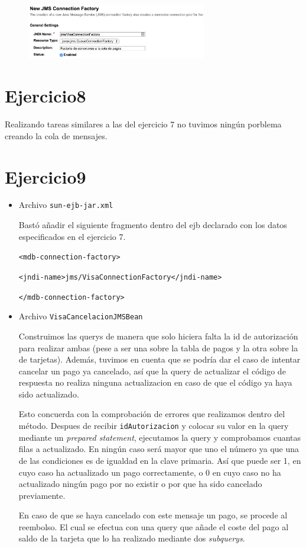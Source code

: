 \documentclass[a4paper, 10pt]{article}
\begin{document}
	\begin{figure}[htbp]
		\centering
		\includegraphics[width=0.7\textwidth]{pantallazos/ejercicio7.png}
	\end{figure}


\pagebreak

\section{Ejercicio8}
	Realizando tareas similares a las del ejercicio 7 no tuvimos ningún porblema creando la cola de mensajes.




\section{Ejercicio9}
 	\begin{itemize}

 		\item Archivo \texttt{sun-ejb-jar.xml}

 		Bastó añadir el siguiente fragmento dentro del ejb declarado con los datos especificados en el ejercicio 7.

 		\texttt{<mdb-connection-factory>}

      	\hspace{3em}\texttt{<jndi-name>jms/VisaConnectionFactory</jndi-name>}

      	\texttt{</mdb-connection-factory>}
 		

 		\item Archivo \texttt{VisaCancelacionJMSBean}

 		Construimos las querys de manera que solo hiciera falta la id de autorización para realizar ambas (pese a ser una sobre la tabla de pagos y la otra sobre la de tarjetas). Además, tuvimos en cuenta que se podría dar el caso de intentar cancelar un pago ya cancelado, así que la query de actualizar el código de respuesta no realiza ninguna actualizacion en caso de que el código ya haya sido actualizado.

 		Esto concuerda con la comprobación de errores que realizamos dentro del método. Despues de recibir \texttt{idAutorizacion} y colocar su valor en la query mediante un \textit{prepared statement}, ejecutamos la query y comprobamos cuantas filas a actualizado. En ningún caso será mayor que uno el número ya que una de las condiciones es de igualdad en la clave primaria. Así que puede ser 1, en cuyo caso ha actualizado un pago correctamente, o 0 en cuyo caso no ha actualizado ningún pago por no existir o por que ha sido cancelado previamente.

 		En caso de que se haya cancelado con este mensaje un pago, se procede al reembolso. El cual se efectua con una query que añade el coste del pago al saldo de la tarjeta que lo ha realizado mediante dos \textit{subquerys}.

 	\end{itemize}
\end{document}
